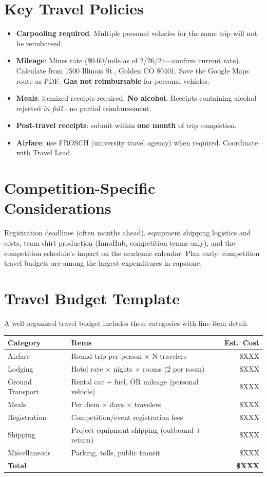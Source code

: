 \section{Key Travel Policies}
\begin{itemize}[nosep,leftmargin=1.5em]
\item \textbf{Carpooling required}. Multiple personal vehicles for the same trip will not be reimbursed.
\item \textbf{Mileage}: Mines rate (\$0.60/mile as of 2/26/24---confirm current rate). Calculate from 1500 Illinois St., Golden CO 80401. Save the Google Maps route as PDF. \textbf{Gas not reimbursable} for personal vehicles.
\item \textbf{Meals}: itemized receipts required. \textbf{No alcohol.} Receipts containing alcohol rejected \emph{in full}---no partial reimbursement.
\item \textbf{Post-travel receipts}: submit within \textbf{one month} of trip completion.
\item \textbf{Airfare}: use FROSCH (university travel agency) when required. Coordinate with Travel Lead.
\end{itemize}

\section{Competition-Specific Considerations}
Registration deadlines (often months ahead), equipment shipping logistics and costs, team shirt production (InnoHub, competition teams only), and the competition schedule's impact on the academic calendar. Plan early; competition travel budgets are among the largest expenditures in capstone.


\section{Travel Budget Template}
A well-organized travel budget includes these categories with line-item detail:

\begin{center}\small
\begin{tabularx}{\textwidth}{lXr}
\toprule
\textbf{Category} & \textbf{Items} & \textbf{Est.\ Cost} \\
\midrule
Airfare & Round-trip per person $\times$ N travelers & \$XXX \\
Lodging & Hotel rate $\times$ nights $\times$ rooms (2 per room) & \$XXX \\
Ground Transport & Rental car + fuel, OR mileage (personal vehicle) & \$XXX \\
Meals & Per diem $\times$ days $\times$ travelers & \$XXX \\
Registration & Competition/event registration fees & \$XXX \\
Shipping & Project equipment shipping (outbound + return) & \$XXX \\
Miscellaneous & Parking, tolls, public transit & \$XXX \\
\midrule
\textbf{Total} & & \textbf{\$XXX} \\
\bottomrule
\end{tabularx}
\end{center}

